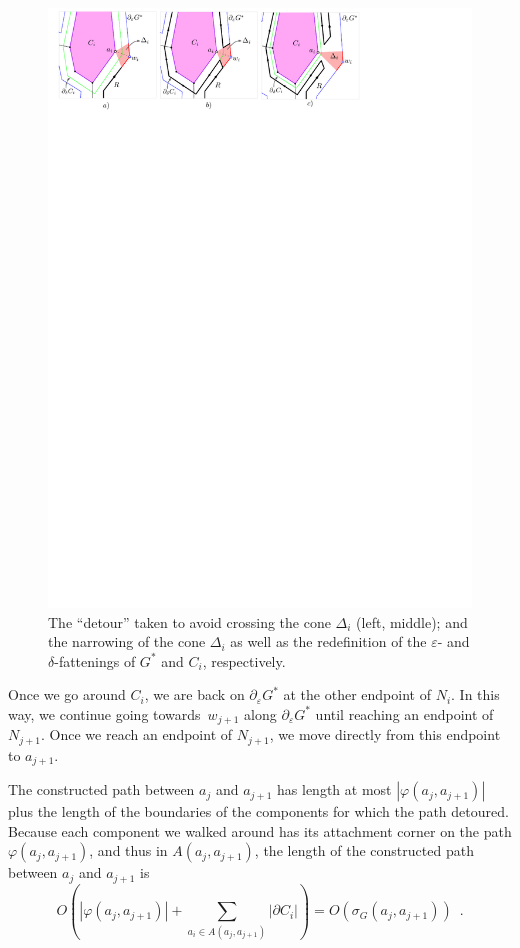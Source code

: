 \documentclass[11pt]{patmorin}
\begin{document}
\begin{figure}[tb]
\centering
\includegraphics{img/SkipComponent.pdf}
\caption{The ``detour'' taken to avoid crossing the cone $\Delta_i$ (left, middle); and the narrowing of the cone $\Delta_i$ as well as the redefinition of the $\varepsilon$- and $\delta$-fattenings of $G^*$ and $C_i$, respectively.}
\label{fig:Skip Component}
\end{figure}

Once we go around $C_i$, we are back on $\partial_\varepsilon G^*$ at the other endpoint of $N_i$. In this way, we continue going towards~$w_{j+1}$ along $\partial_\varepsilon G^*$ until reaching an endpoint of $N_{j+1}$.
Once we reach an endpoint of $N_{j+1}$, we move directly from this endpoint to $a_{j+1}$.

The constructed path between $a_j$ and $a_{j+1}$ has length at most $|\varphi(a_j, a_{j+1})|$ plus the length of the boundaries of the components for which the path detoured. Because each component we walked around has its attachment corner on the path $\varphi(a_j, a_{j+1})$, and thus in $A(a_j, a_{j+1})$, the length of the constructed path between $a_j$ and $a_{j+1}$ is
\[ O\left(|\varphi(a_j, a_{j+1})| + \sum_{a_i\in A(a_j, a_{j+1})} |\partial C_i|\right) = O(\sigma_G(a_j, a_{j+1})) \enspace .
\]
\end{document}

